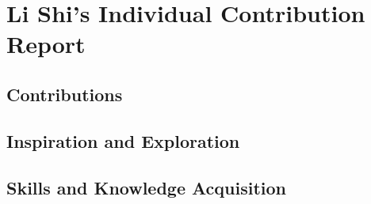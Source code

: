 \chapter*{Li Shi's Individual Contribution Report}

\blindtext

\section*{Contributions}

\blindtext

\section*{Inspiration and Exploration}

\blindtext

\section*{Skills and Knowledge Acquisition}

\blindtext